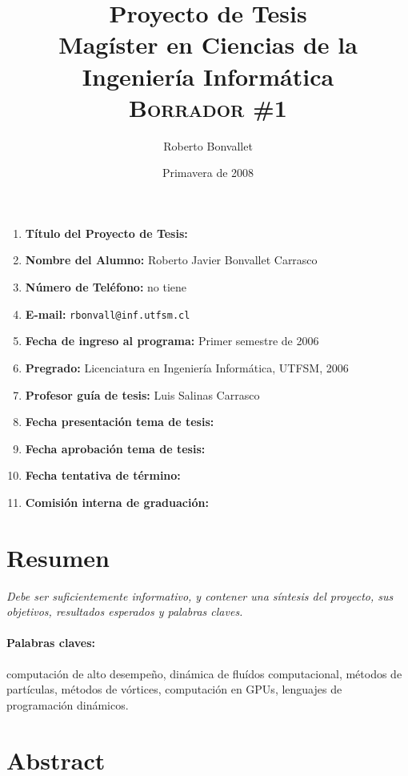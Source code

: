 \documentclass[11pt,spanish]{article}
\title{Proyecto de Tesis \\
    Magíster en Ciencias de la Ingeniería Informática \\
    \textsc{Borrador \#1}
}
\author{Roberto Bonvallet}
\date{Primavera de 2008}
\begin{document}
\maketitle
\thispagestyle{empty}
\begin{enumerate}
    \item \textbf{Título del Proyecto de Tesis:}
 
    \item \textbf{Nombre del Alumno:}
        Roberto Javier Bonvallet Carrasco
    \item \textbf{Número de Teléfono:}
        no tiene
         
    \item \textbf{E-mail:}
        \texttt{rbonvall@inf.utfsm.cl}
    \item \textbf{Fecha de ingreso al programa:}
        Primer semestre de 2006
    \item \textbf{Pregrado:}
        Licenciatura en Ingeniería Informática, UTFSM, 2006
    \item \textbf{Profesor guía de tesis:}
        Luis Salinas Carrasco
    \item \textbf{Fecha presentación tema de tesis:}
    \item \textbf{Fecha aprobación tema de tesis:}
    \item \textbf{Fecha tentativa de término:}
    \item \textbf{Comisión interna de graduación:}
\end{enumerate}

\newpage
\section*{Resumen}

\emph{Debe ser suficientemente informativo, y contener una síntesis del proyecto, sus
objetivos, resultados esperados y palabras claves. }



\paragraph{Palabras claves:}
computación de alto desempeño,
dinámica de fluídos computacional,
métodos de partículas,
métodos de vórtices,
computación en GPUs,
lenguajes de programación dinámicos.


\section*{Abstract}
\end{document}
